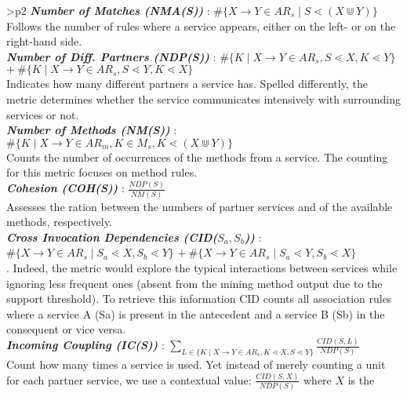\begin{figure*}
{\renewcommand{\arraystretch}{1.5}
\begin{tabular}{>{\small}p{}
\hline
\textbf{\textit{Number of Matches (NMA(S))}} : $\#\{X\rightarrow Y\in AR_{s}\mid S\lessdot(X\Cup Y)\}$ \\
Follows the number of rules where a service appears, either on the left- or on the right-hand side. \\ \hline \hline
\textbf{\textit{Number of Diff. Partners (NDP(S))}} : $\#\{K\mid X\rightarrow Y\in AR_{s},S\lessdot X,K\lessdot Y\}$
  $+~\#\{K\mid X\rightarrow Y\in AR_{s},S\lessdot Y,K\lessdot X\}$ \\ 
Indicates how many different partners a service
has. Spelled differently, the metric determines whether the
service communicates intensively with surrounding services
or not. \\ \hline \hline
\textbf{\textit{Number of Methods (NM(S))}} : $\#\{K\mid X\rightarrow Y\in AR_{m},K\in M_{s},K\lessdot(X\Cup Y)\}$ \\ 
Counts
the number of occurrences of the methods from a service.
The counting for this metric focuses on method rules.
 \\ \hline \hline 
\textbf{\textit{Cohesion (COH(S))}} : $\frac{NDP(S)}{NM(S)}$ \\
Assesses the ration
between the numbers of partner services and of the available
methods, respectively. \\ \hline \hline
\textbf{\textit{Cross Invocation Dependencies (CID($S_{a},S_{b}$))}} : $\#\{X\rightarrow Y\in AR_{s}\mid S_{a}\lessdot X,S_{b}\lessdot Y\}$ $+~ \#\{X\rightarrow Y\in AR_{s}\mid S_{a}\lessdot Y,S_{b}\lessdot X\}$  \\
. Indeed, the metric would explore the typical
interactions between services while ignoring less frequent
ones (absent from the mining method output due to the
support threshold). To retrieve this information CID counts
all association rules where a service A (Sa) is present in
the antecedent and a service B (Sb) in the consequent or
vice versa. \\ \hline \hline
\textbf{\textit{Incoming Coupling (IC(S))}} : $\sum_{L\in\{K\mid X\rightarrow Y\in AR_{s},K\lessdot X,S\lessdot Y\}}\frac{CID(S,L)}{NDP(S)}$ \\
Count how many times a service is used.
Yet instead of merely counting a unit for each partner service, we
use a contextual value: $\frac{CID(S,X)}{NDP(S)}$ where $X$ is the
}
\end{tabular}}
\end{figure*}
